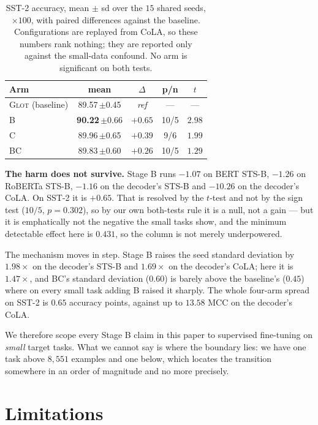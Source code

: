 \documentclass{article}
\begin{document}
\begin{table}[h]
\caption{SST-2 accuracy, mean $\pm$ sd over the $15$ shared seeds, $\times100$,
with paired differences against the baseline. Configurations are replayed from
CoLA, so these numbers rank nothing; they are reported only against the
small-data confound. No arm is significant on both tests.}
\label{tab:sst2}
\begin{center}
\small
\begin{tabular}{lcccc}
\toprule
Arm & mean & $\Delta$ & p/n & $t$ \\
\midrule
\textsc{Glot} (baseline) & 89.57\,$\pm$0.45 & \emph{ref} & --- & --- \\
B  & \textbf{90.22}\,$\pm$0.66 & $+0.65$ & 10/5 & $2.98$ \\
C  & 89.96\,$\pm$0.65 & $+0.39$ & \phantom{0}9/6 & $1.99$ \\
BC & 89.83\,$\pm$0.60 & $+0.26$ & 10/5 & $1.29$ \\
\bottomrule
\end{tabular}
\end{center}
\end{table}

\textbf{The harm does not survive.} Stage B runs $-1.07$ on BERT STS-B, $-1.26$
on RoBERTa STS-B, $-1.16$ on the decoder's STS-B and $-10.26$ on the decoder's
CoLA. On SST-2 it is $+0.65$. That is resolved by the $t$-test and not by the
sign test ($10/5$, $p=0.302$), so by our own both-tests rule it is a null, not a
gain --- but it is emphatically not the negative the small tasks show, and the
minimum detectable effect here is $0.431$, so the column is not merely
underpowered.

The mechanism moves in step. Stage B raises the seed standard deviation by
$1.98\times$ on the decoder's STS-B and $1.69\times$ on the decoder's CoLA; here
it is $1.47\times$, and BC's standard deviation ($0.60$) is barely above the
baseline's ($0.45$) where on every small task adding B raised it sharply. The
whole four-arm spread on SST-2 is $0.65$ accuracy points, against up to $13.58$
MCC on the decoder's CoLA.

We therefore scope every Stage B claim in this paper to supervised fine-tuning
on \emph{small} target tasks. What we cannot say is where the boundary lies: we
have one task above $8{,}551$ examples and one below, which locates the
transition somewhere in an order of magnitude and no more precisely.

\section{Limitations}
\label{app:limitations}
\end{document}
